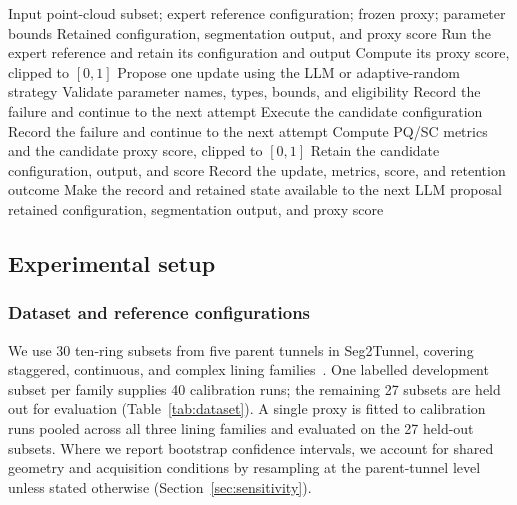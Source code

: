 \documentclass[a4paper,fleqn]{cas-dc}
\begin{document}
{\begin{algorithm}[ht]
\caption{Proxy-guided parameter self-refinement}
\label{alg:reflective_adaptation}
\begin{algorithmic}[1]
\Require Input point-cloud subset; expert reference configuration; frozen proxy; parameter bounds
\Ensure Retained configuration, segmentation output, and proxy score
\State Run the expert reference and retain its configuration and output
\State Compute its proxy score, clipped to $[0,1]$
    \State Propose one update using the LLM or adaptive-random strategy
    \State Validate parameter names, types, bounds, and eligibility
        \State Record the failure and continue to the next attempt
    \EndIf
    \State Execute the candidate configuration
        \State Record the failure and continue to the next attempt
    \EndIf
    \State Compute PQ/SC metrics and the candidate proxy score, clipped to $[0,1]$
        \State Retain the candidate configuration, output, and score
    \EndIf
    \State Record the update, metrics, score, and retention outcome
    \State Make the record and retained state available to the next LLM proposal
\EndFor
\State \Return retained configuration, segmentation output, and proxy score
\end{algorithmic}
\end{algorithm}


\subsection{Experimental setup}
\label{sec:exp-setup}

\subsubsection{Dataset and reference configurations}
\label{sec:dataset}
We use 30 ten-ring subsets from five parent tunnels in Seg2Tunnel, covering staggered, continuous, and complex lining families~\cite{lin2024seg2tunnel}. One labelled development subset per family supplies 40 calibration runs; the remaining 27 subsets are held out for evaluation (Table~\ref{tab:dataset}). A single proxy is fitted to calibration runs pooled across all three lining families and evaluated on the 27 held-out subsets. Where we report bootstrap confidence intervals, we account for shared geometry and acquisition conditions by resampling at the parent-tunnel level unless stated otherwise (Section~\ref{sec:sensitivity}).


}
\end{document}
